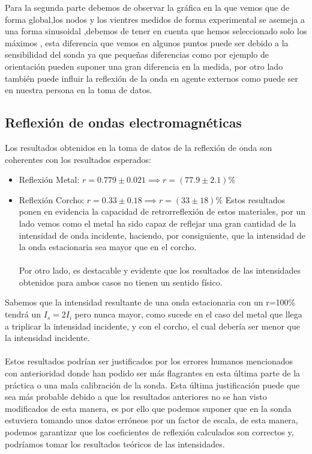 \documentclass[a4paper,10pt,twocolumns]{article}
\begin{document}
Para la segunda parte debemos de observar la gráfica en la que vemos que de forma global,los nodos y los vientres medidos de forma experimental se asemeja a una forma sinusoidal ,debemos de tener en cuenta que hemos seleccionado solo los máximos  , esta diferencia que vemos en algunos puntos puede ser debido a la sensibilidad del sonda ya que pequeñas diferencias como por ejemplo de orientación pueden suponer una gran diferencia en la medida, por otro lado también puede influir la reflexión de la onda en agente externos como puede ser en nuestra persona en la toma de datos.

\subsection{Reflexión de ondas electromagnéticas}


Los resultados obtenidos en la toma de datos de la reflexión de onda son coherentes con los resultados esperados:

\begin{itemize}
\item Reflexión Metal: $r=0.779 \pm 0.021 \implies r=(77.9 \pm 2.1)\% $
\item Reflexión Corcho: $r=0.33 \pm 0.18 \implies r=(33\pm 18)\%$
Estos resultados ponen en evidencia la capacidad de retrorreflexión de estos materiales, por un lado vemos como el metal ha sido capaz de reflejar una gran cantidad de la intensidad de onda incidente, haciendo, por consiguiente, que la intensidad de la onda estacionaria sea mayor que en el corcho. 
\\
\\
Por otro lado, es destacable y evidente que los resultados de las intensidades obtenidos para ambos casos no tienen un sentido físico.
\end{itemize}

Sabemos que la intensidad resultante de una onda estacionaria con un r=100\% tendrá un $I_s=2I_i$ pero nunca mayor, como sucede en el caso del metal que llega a triplicar la intensidad incidente, y con el corcho, el cual debería ser menor que la intensidad incidente.\\
\\

 Estos resultados podrían ser justificados por los errores humanos mencionados con anterioridad donde han podido ser más flagrantes en esta última parte de la práctica o una mala calibración de la sonda. Esta última justificación puede que sea más probable debido a que los resultados anteriores no se han visto modificados de esta manera, es por ello que podemos suponer que en la sonda estuviera tomando unos datos erróneos por un factor de escala, de esta manera, podemos garantizar que los coeficientes de reflexión calculados son correctos y, podríamos tomar los resultados teóricos de las intensidades.
\end{document}
